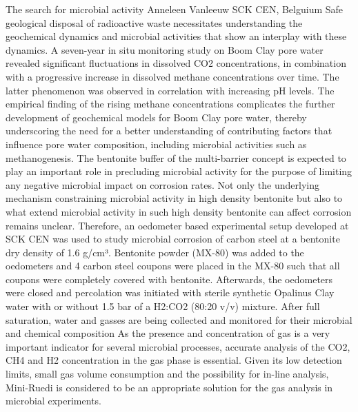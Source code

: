 \begin{conf-abstract}
{The search for microbial activity}
{Anneleen Vanleeuw}
{SCK CEN, Belguium}
{Safe geological disposal of radioactive waste necessitates understanding the geochemical dynamics and microbial activities that show an interplay with these dynamics. A seven-year in situ monitoring study on Boom Clay pore water revealed significant fluctuations in dissolved CO2 concentrations, in combination with a progressive increase in dissolved methane concentrations over time. The latter phenomenon was observed in correlation with increasing pH levels. The empirical finding of the rising methane concentrations complicates the further development of geochemical models for Boom Clay pore water, thereby underscoring the need for a better understanding of contributing factors that influence pore water composition, including microbial activities such as methanogenesis. 
The bentonite buffer of the multi-barrier concept is expected to play an important role in precluding microbial activity for the purpose of limiting any negative microbial impact on corrosion rates. Not only the underlying mechanism constraining microbial activity in high density bentonite but also to what extend microbial activity in such high density bentonite can affect corrosion remains unclear. Therefore, an oedometer based experimental setup developed at SCK CEN was used to study microbial corrosion of carbon steel at a bentonite dry density of 1.6 g/cm³. Bentonite powder (MX-80) was added to the oedometers and 4 carbon steel coupons were placed in the MX-80 such that all coupons were completely covered with bentonite. Afterwards, the oedometers were closed and percolation was initiated with sterile synthetic Opalinus Clay water with or without 1.5 bar of a H2:CO2 (80:20 v/v) mixture. After full saturation, water and gasses are being collected and monitored for their microbial and chemical composition 
As the presence and concentration of gas is a very important indicator for several microbial processes, accurate analysis of the CO2, CH4 and H2 concentration in the gas phase is essential. Given its low detection limits, small gas volume consumption and the possibility for in-line analysis, Mini-Ruedi is considered to be an appropriate solution for the gas analysis in microbial experiments.}
\end{conf-abstract}

